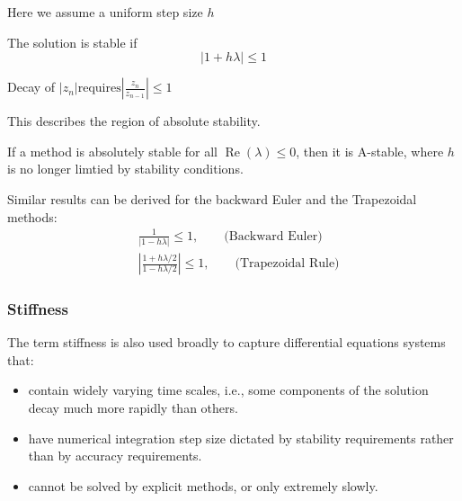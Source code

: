 \documentclass[letterpaper, 11pt]{article}
\providecommand{\note}[1]{\begin{margintable}{\footnotesize #1}\end{margintable}}
\providecommand{\abs}[1]{\ensuremath{\left | #1\right |}}
\begin{document}
\note{Here we assume a uniform step size $h$}
The solution is stable if 
\begin{equation}
\label{eq:ivp-forward-euler-stability-condition}
\left | 1 + h\lambda \right | \leq 1 
\end{equation} 
\begin{margintable}
\footnotesize
Decay of $\abs{z_{n}} \text{requires} \abs{\frac{z_{n}}{z_{n-1}}} \leq 1$
\end{margintable}
This describes the region of absolute stability.
\begin{margintable}
\footnotesize
If a method is absolutely stable for all $\operatorname{Re}(\lambda) \leq 0$, then it is A-stable, where $h$ is no longer limtied by stability conditions.
\end{margintable}
Similar results can be derived for the backward Euler and the Trapezoidal methods:
\begin{subequations}
\begin{align}
\label{eq:ivp-stability-conditions}
&\frac{1}{\abs{ 1 - h\lambda}} \leq 1, \qquad \text{(Backward Euler)} \\
&\abs{\frac{1+h\lambda/2}{1-h\lambda/2}} \leq 1, \qquad \text{(Trapezoidal Rule)}
\end{align}
\end{subequations}

\subsubsection{Stiffness}
\label{sec-1-2-2}
The term stiffness is also used broadly to capture differential equations systems that:
\begin{itemize}
\item contain widely varying time scales, i.e., some components of the solution decay much more rapidly than others.
\item have numerical integration step size dictated by stability requirements rather than by accuracy requirements.
\item cannot be solved by explicit methods, or only extremely slowly.
\end{itemize}
\end{document}
